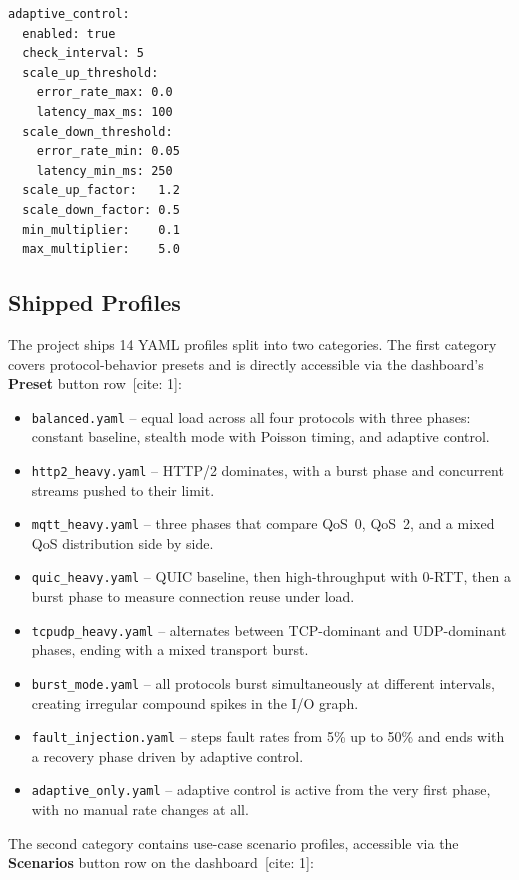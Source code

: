 \begin{verbatim}
adaptive_control:
  enabled: true
  check_interval: 5
  scale_up_threshold:
    error_rate_max: 0.0
    latency_max_ms: 100
  scale_down_threshold:
    error_rate_min: 0.05
    latency_min_ms: 250
  scale_up_factor:   1.2
  scale_down_factor: 0.5
  min_multiplier:    0.1
  max_multiplier:    5.0
\end{verbatim}

\subsection{Shipped Profiles}

\noindent The project ships 14 YAML profiles split into two categories.
The first category covers protocol-behavior presets and is directly accessible via the
dashboard's \textbf{Preset} button row~[cite: 1]:

\begin{itemize}
  \item \texttt{balanced.yaml} -- equal load across all four protocols with three phases:
        constant baseline, stealth mode with Poisson timing, and adaptive control.
  \item \texttt{http2\_heavy.yaml} -- HTTP/2 dominates, with a burst phase and concurrent
        streams pushed to their limit.
  \item \texttt{mqtt\_heavy.yaml} -- three phases that compare QoS~0, QoS~2, and a mixed
        QoS distribution side by side.
  \item \texttt{quic\_heavy.yaml} -- QUIC baseline, then high-throughput with 0-RTT, then
        a burst phase to measure connection reuse under load.
  \item \texttt{tcpudp\_heavy.yaml} -- alternates between TCP-dominant and UDP-dominant
        phases, ending with a mixed transport burst.
  \item \texttt{burst\_mode.yaml} -- all protocols burst simultaneously at different
        intervals, creating irregular compound spikes in the I/O graph.
  \item \texttt{fault\_injection.yaml} -- steps fault rates from 5\% up to 50\% and
        ends with a recovery phase driven by adaptive control.
  \item \texttt{adaptive\_only.yaml} -- adaptive control is active from the very first
        phase, with no manual rate changes at all.
\end{itemize}

\noindent The second category contains use-case scenario profiles, accessible via the
\textbf{Scenarios} button row on the dashboard~[cite: 1]:

